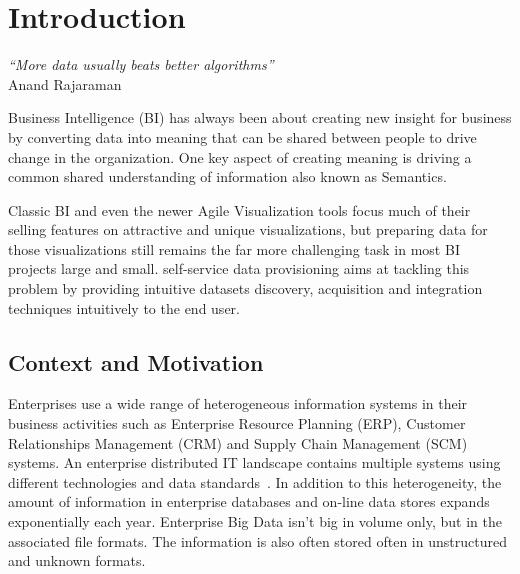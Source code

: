\chapter{Introduction}  \label{ch:intro}

\begin{flushright}
\textit{``More data usually beats better algorithms''}\\
 Anand Rajaraman

\end{flushright}

Business Intelligence (BI) has always been about creating new insight for business by converting data into meaning that can be shared between people to drive change in the organization. One key aspect of creating meaning is driving a common shared understanding of information also known as Semantics.

Classic BI and even the newer Agile Visualization tools focus much of their selling features on attractive and unique visualizations, but preparing data for those visualizations still remains the far more challenging task in most BI projects large and small. self-service data provisioning aims at tackling this problem by providing intuitive datasets discovery, acquisition and integration techniques intuitively to the end user.

\section{Context and Motivation} \label{sec:motivation}

Enterprises use a wide range of heterogeneous information systems in their business activities such as Enterprise Resource Planning (ERP), Customer Relationships Management (CRM) and Supply Chain Management (SCM) systems. An enterprise distributed IT landscape contains multiple systems using different technologies and data standards~\cite{Mihindukulasooriya:COLD:13}. In addition to this heterogeneity, the amount of information in enterprise databases and on-line data stores expands exponentially each year. Enterprise Big Data isn't big in volume only, but in the associated file formats. The information is also often stored often in unstructured and unknown formats.

